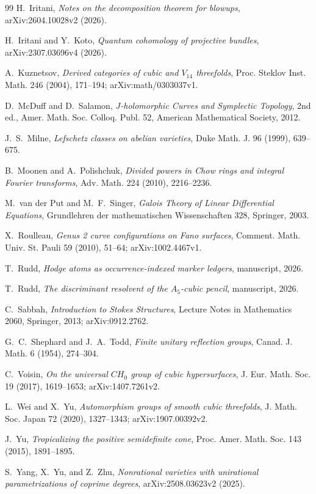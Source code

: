 \documentclass[11pt]{article}
\numberwithin{equation}{section}
\theoremstyle{definition}
\theoremstyle{remark}
\begin{document}
\begin{thebibliography}{99}
H.~Iritani,
\emph{Notes on the decomposition theorem for blowups},
arXiv:2604.10028v2 (2026).

H.~Iritani and Y.~Koto,
\emph{Quantum cohomology of projective bundles},
arXiv:2307.03696v4 (2026).

A.~Kuznetsov,
\emph{Derived categories of cubic and \(V_{14}\) threefolds},
Proc. Steklov Inst. Math. 246 (2004), 171--194;
arXiv:math/0303037v1.

D.~McDuff and D.~Salamon,
\emph{\(J\)-holomorphic Curves and Symplectic Topology}, 2nd ed.,
Amer. Math. Soc. Colloq. Publ. 52, American Mathematical Society, 2012.

J.~S.~Milne,
\emph{Lefschetz classes on abelian varieties},
Duke Math. J. 96 (1999), 639--675.

B.~Moonen and A.~Polishchuk,
\emph{Divided powers in Chow rings and integral Fourier transforms},
Adv. Math. 224 (2010), 2216--2236.

M.~van der Put and M.~F.~Singer,
\emph{Galois Theory of Linear Differential Equations},
Grundlehren der mathematischen Wissenschaften 328, Springer, 2003.

X.~Roulleau,
\emph{Genus 2 curve configurations on Fano surfaces},
Comment. Math. Univ. St. Pauli 59 (2010), 51--64;
arXiv:1002.4467v1.

T.~Rudd,
\emph{Hodge atoms as occurrence-indexed marker ledgers},
manuscript, 2026.

T.~Rudd,
\emph{The discriminant resolvent of the \(A_5\)-cubic pencil},
manuscript, 2026.

C.~Sabbah,
\emph{Introduction to Stokes Structures},
Lecture Notes in Mathematics 2060, Springer, 2013;
arXiv:0912.2762.

G.~C.~Shephard and J.~A.~Todd,
\emph{Finite unitary reflection groups},
Canad. J. Math. 6 (1954), 274--304.

C.~Voisin,
\emph{On the universal \(CH_0\) group of cubic hypersurfaces},
J. Eur. Math. Soc. 19 (2017), 1619--1653; arXiv:1407.7261v2.

L.~Wei and X.~Yu,
\emph{Automorphism groups of smooth cubic threefolds},
J. Math. Soc. Japan 72 (2020), 1327--1343; arXiv:1907.00392v2.

J.~Yu,
\emph{Tropicalizing the positive semidefinite cone},
Proc. Amer. Math. Soc. 143 (2015), 1891--1895.

S.~Yang, X.~Yu, and Z.~Zhu,
\emph{Nonrational varieties with unirational parametrizations of coprime
degrees}, arXiv:2508.03623v2 (2025).

\end{thebibliography}
\end{document}
